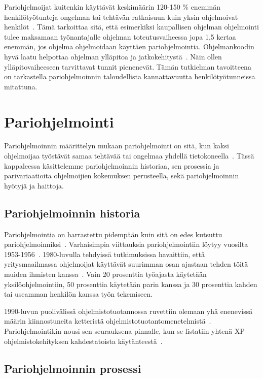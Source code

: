 \documentclass[finnish]{tktltiki2}
\theoremstyle{definition}
\theoremstyle{remark}
\begin{document}
Pariohjelmoijat kuitenkin käyttävät keskimäärin 120-150 \% enemmän henkilötyötunteja ongelman tai tehtävän ratkaisuun kuin yksin ohjelmoivat henkilöt~\cite{williams01support}. Tämä tarkoittaa sitä, että esimerkiksi kaupallisen ohjelman ohjelmointi tulee maksamaan työnantajalle ohjelman toteutusvaiheessa jopa 1,5 kertaa enemmän, jos ohjelma ohjelmoidaan käyttäen pariohjelmointia. Ohjelmankoodin hyvä laatu helpottaa ohjelman ylläpitoa ja jatkokehitystä~\cite{pearse95maintainability}. Näin ollen ylläpitovaiheeseen tarvittavat tunnit pienenevät. Tämän tutkielman tavoitteena on tarkastella pariohjelmoinnin taloudellista kannattavuutta henkilötyötunneissa mitattuna.

\section{Pariohjelmointi}

Pariohjelmoinnin määrittelyn mukaan pariohjelmointi on sitä, kun kaksi ohjelmoijaa työstävät samaa tehtävää tai ongelmaa yhdellä tietokoneella~\cite{nawrocki01exp}. Tässä kappaleessa käsittelemme pariohjelmoinnin historiaa, sen prosessia ja parivariaatioita ohjelmoijien kokemuksen perusteella, sekä pariohjelmoinnin hyötyjä ja haittoja.

\subsection{Pariohjelmoinnin historia}

Pariohjelmointia on harrastettu pidempään kuin sitä on edes kutsuttu pariohjelmoinniksi~\cite{williams03pair}. Varhaisimpia viittauksia pariohjelmointiin löytyy vuosilta 1953-1956~\cite{williams96pair}. 1980-luvulla tehdyissä tutkimuksissa havaittiin, että yritysmaailmassa ohjelmoijat käyttävät suurimman osan ajastaan tehden töitä muiden ihmisten kanssa~\cite{lister87peopleware}. Vain 20 prosenttia työajasta käytetään yksilöohjelmointiin, 50 prosenttia käytetään parin kanssa ja 30 prosenttia kahden tai useamman henkilön kanssa työn tekemiseen.


1990-luvun puolivälissä ohjelmistotuotannossa ruvettiin olemaan yhä enenevissä määrin kiinnostuneita ketteristä ohjelmistotuotantomenetelmistä~\cite{martin2003agile}. Pariohjelmointikin nousi sen seurauksena pinnalle, kun se listatiin yhtenä XP-ohjelmistokehityksen kahdestatoista käytänteestä~\cite{beck00extreme}.

\subsection{Pariohjelmoinnin prosessi}
\end{document}
